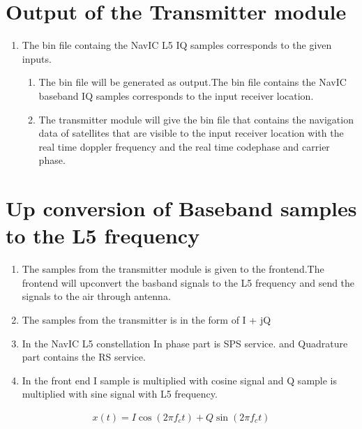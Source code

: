 \section{Output of the Transmitter module}
\begin{enumerate}
	\item The bin file containg the NavIC L5 IQ samples corresponds to the given inputs. 
	\begin{enumerate}
		\item The bin file will be generated as output.The bin file contains the NavIC baseband IQ samples corresponds to the input receiver location.
		\item The transmitter module will give the bin file that contains the navigation data of satellites that are visible to the input receiver location with the real time doppler frequency and the real time codephase and carrier phase.
	\end{enumerate}
\end{enumerate}


\section{Up conversion of Baseband samples to the L5 frequency}
\begin{enumerate}
\item The samples from the transmitter module is given to the frontend.The frontend will upconvert the basband signals to the L5 frequency and send the signals to the air through antenna.
\item The samples from the transmitter is in the form of I + jQ
\item In the NavIC L5 constellation In phase part is SPS service. and Quadrature part contains the RS service.
\item In the front end I sample is multiplied with cosine signal and Q sample is multiplied with sine signal with L5 frequency.
\end{enumerate}

\begin{align}
    x(t) = I \cos(2\pi f_c t) + Q \sin(2\pi f_c t)
\end{align}

